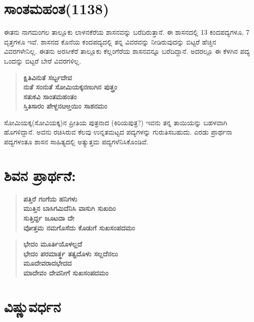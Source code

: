 \section{ಸಾಂತಮಹಂತ(1138)}

ಈತನು ನಾಗಮಂಗಲ ತಾಲ್ಲೂಕು ಲಾಳನಕೆರೆಯ ಶಾಸನವನ್ನು ಬರೆದಿರುತ್ತಾನೆ. ಈ ಶಾಸನದಲ್ಲಿ 13 ಕಂದಪದ್ಯಗಳೂ, 7 ವೃತ್ತಗಳೂ ಇವೆ. ಶಾಸನದ ಕೊನೆಯ ಕಂದಪದ್ಯದಲ್ಲಿ ತನ್ನ ವಿವರವನ್ನು ನೀಡಿರುವುದನ್ನು ಬಿಟ್ಟರೆ ಹೆಚ್ಚಿನ ವಿವರಗಳೇನಿಲ್ಲ. ಈತನು ಅರಸೀಕೆರೆ ತಾಲ್ಲೂಕು ಕೆಲ್ಲಂಗೆರೆಯ ಶಾಸನವನ್ನೂ ಬರೆದಿದ್ದಾನೆ. ಅದರಲ್ಲೂ ಈ ಕೆಳಗಿನ ಪದ್ಯ ಒಂದನ್ನು ಬಿಟ್ಟರೆ ಬೇರೆ ವಿವರಗಳಿಲ್ಲ.

\begin{verse}
\textbf{ಕ್ಷಿತಿವಿನುತೆ ಸರ್ಬ್ಬದೇವ} \\\textbf{ನುತೆ ಸಂನುತೆ ಸೋಮಿಯಕ್ಕನಣುಗಿನ ಪುತ್ತ್ರಂ} \\\textbf{ಸತುಕವಿ ಸಾಂತಮಹಂತಂ} \\\textbf{ಸ್ತಿತಿಸಾರಂ ಪೇಳ್ದನೞಅ್ತಯಿಂ ಸಾಶನಮಂ }
\end{verse}

ಸೋಮಿಯಕ್ಕ(ಸೋವಿಯಕ್ಕ)ನ ಪ್ರೀತಿಯ ಪುತ್ರನಾದ (ಕಿರಿಯಪುತ್ರ?) ಇವನು ತನ್ನ ತಾಯಿಯನ್ನು ಬಹಳವಾಗಿ ಹೊಗಳಿದ್ದಾನೆ. ಅವನು ರಚಿಸಿರುವ ಕೆಲವು ಉನ್ನತಮಟ್ಟದ ಪದ್ಯಗಳನ್ನು ಗುರುತಿಸಬಹುದು. ಎರಡು ಪ್ರಾರ್ಥನಾ ಪದ್ಯಗಳಂತೂ ಶಾಸನ ಸಾಹಿತ್ಯದಲ್ಲಿ ಅತ್ಯುತ್ತಮ ಪದ್ಯಗಳೆನಿಸಿಕೊಂಡಿವೆ.


\section{ಶಿವನ ಪ್ರಾರ್ಥನೆ:}

\begin{verse}
\textbf{ಪತ್ತಿರೆ ಗಂಗೆಯ ಹನಿಗಳು} \\\textbf{ಮುತ್ತಿನ ಬಾಸಿಗಮಿದೆನಿಸಿ ವಾಸುಗಿ ಸುಖದಿಂ} \\\textbf{ಸುತ್ತಿರ್ದ್ದ ಜೂಟದಾ ದೇ} \\\textbf{ವೋತ್ತಮ ನಮಗೊಸೆದು ಕೊಡುಗೆ ಸುಖಸಂಪದಮಂ}
\end{verse}

\begin{verse}
\textbf{ಭೇದಂ ಮೂರ್ತಿಯೊಳಲ್ಲದೆ} \\\textbf{ಭೇದಂ ಪರಮಾರ್ತ್ಥ ತತ್ವದೊಳು ಸಲ್ಲದೆನಲು} \\\textbf{ಮೂದೇವರಾದಭೇದದ} \\\textbf{ಮಾದೇವಂ ದೇವನೀಗೆ ಸುಖಸಂಪದಮಂ}
\end{verse}


\section{ವಿಷ್ಣುವರ್ಧನ}

